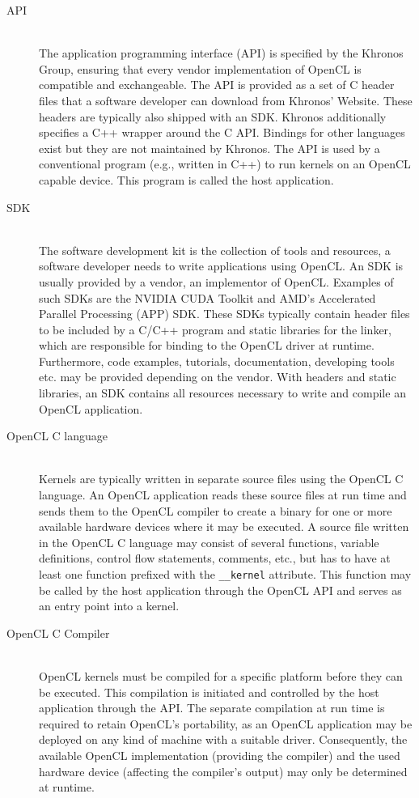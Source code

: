 \begin{description}
	\item[API] \hfill \\
	The application programming interface (API) is specified by the Khronos Group, ensuring that every vendor implementation of OpenCL is compatible and exchangeable. The API is provided as a set of C header files that a software developer can download from Khronos' Website. These headers are typically also shipped with an SDK. Khronos additionally specifies a C++ wrapper around the C API. Bindings for other languages exist but they are not maintained by Khronos.
	The API is used by a conventional program (e.g., written in C++) to run kernels on an OpenCL capable device. This program is called the host application.
	
	\item[SDK] \hfill \\
	The software development kit is the collection of tools and resources, a software developer needs to write applications using OpenCL. An SDK is usually provided by a vendor, an implementor of OpenCL. Examples of such SDKs are the NVIDIA CUDA Toolkit and AMD's Accelerated Parallel Processing (APP) SDK. These SDKs typically contain header files to be included by a C/C++ program and static libraries for the linker, which are responsible for binding to the OpenCL driver at runtime. Furthermore, code examples, tutorials, documentation, developing tools etc. may be provided depending on the vendor. With headers and static libraries, an SDK contains all resources necessary to write and compile an OpenCL application.
	
	\item[OpenCL C language] \hfill \\
	Kernels are typically written in separate source files using the OpenCL C language. An OpenCL application reads these source files at run time and sends them to the OpenCL compiler to create a binary for one or more available hardware devices where it may be executed. A source file written in the OpenCL C language may consist of several functions, variable definitions, control flow statements, comments, etc., but has to have at least one function prefixed with the \lstinline!__kernel! attribute. This function may be called by the host application through the OpenCL API and serves as an entry point into a kernel.
	
	\item[OpenCL C Compiler] \hfill \\
	OpenCL kernels must be compiled for a specific platform before they can be executed. This compilation is initiated and controlled by the host application through the API. The separate compilation at run time is required to retain OpenCL's portability, as an OpenCL application may be deployed on any kind of machine with a suitable driver. Consequently, the available OpenCL implementation (providing the compiler) and the used hardware device (affecting the compiler's output) may only be determined at runtime.
	

\end{description}
